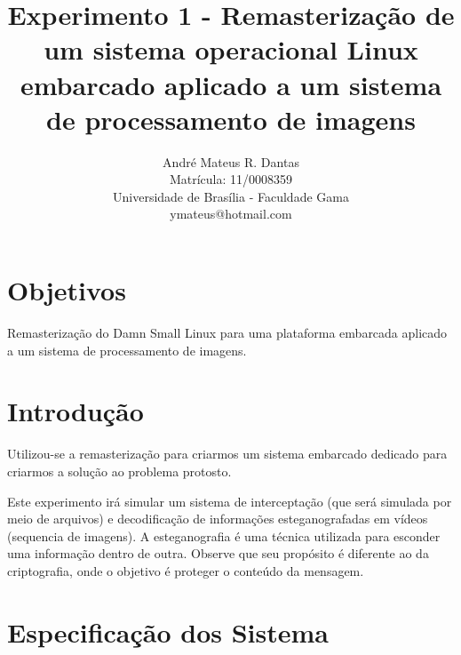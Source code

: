 \documentclass{ieee}
\begin{document}
\title{ Experimento 1 - Remasterização de um sistema operacional
Linux embarcado aplicado a um sistema de processamento de imagens
}

\author{André Mateus R. Dantas\\
Matrícula: 11/0008359\\
Universidade de Brasília - Faculdade Gama \\
ymateus@hotmail.com\\
}

\maketitle
\thispagestyle{empty}

\section{Objetivos}

Remasterização do Damn Small Linux para uma plataforma embarcada aplicado a um sistema de
processamento de imagens.

 \section{Introdução}
Utilizou-se a remasterização para criarmos um sistema embarcado dedicado para criarmos a solução ao
problema protosto.

Este experimento irá  simular um sistema de interceptação (que será simulada por meio de arquivos)
e decodificação de informações esteganografadas em vídeos (sequencia de imagens). A esteganografia é
uma técnica utilizada para esconder uma informação dentro de outra. Observe que seu propósito é
diferente ao da criptografia, onde o objetivo é proteger o conteúdo da mensagem.

\section{Especificação dos Sistema }
\end{document}
